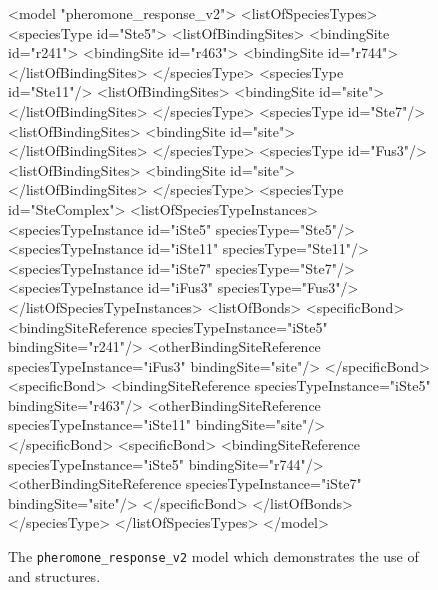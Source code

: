 \documentclass{cekarticle}
\begin{document}
\begin{figure}[h]
\begin{example}
<model "pheromone_response_v2">
    <listOfSpeciesTypes>
        <speciesType id="Ste5">
            <listOfBindingSites>
                <bindingSite id="r241">
                <bindingSite id="r463">
                <bindingSite id="r744">
            </listOfBindingSites>
        </speciesType>
        <speciesType id="Ste11"/>
            <listOfBindingSites>
                <bindingSite id="site">
            </listOfBindingSites>
        </speciesType>
        <speciesType id="Ste7"/>
            <listOfBindingSites>
                <bindingSite id="site">
            </listOfBindingSites>
        </speciesType>
        <speciesType id="Fus3"/>
            <listOfBindingSites>
                <bindingSite id="site">
            </listOfBindingSites>
        </speciesType>
        <speciesType id="SteComplex">
            <listOfSpeciesTypeInstances>
                <speciesTypeInstance id="iSte5" speciesType="Ste5"/>
                <speciesTypeInstance id="iSte11" speciesType="Ste11"/>
                <speciesTypeInstance id="iSte7" speciesType="Ste7"/>
                <speciesTypeInstance id="iFus3" speciesType="Fus3"/>
            </listOfSpeciesTypeInstances>
            <listOfBonds>
                <specificBond>
                    <bindingSiteReference speciesTypeInstance="iSte5" bindingSite="r241"/>
                    <otherBindingSiteReference
                        speciesTypeInstance="iFus3" bindingSite="site"/>
                </specificBond>
                <specificBond>
                    <bindingSiteReference speciesTypeInstance="iSte5" bindingSite="r463"/>
                    <otherBindingSiteReference
                        speciesTypeInstance="iSte11" bindingSite="site"/>
                </specificBond>
                <specificBond>
                    <bindingSiteReference speciesTypeInstance="iSte5" bindingSite="r744"/>
                    <otherBindingSiteReference
                        speciesTypeInstance="iSte7" bindingSite="site"/>
                </specificBond>
            </listOfBonds>
        </speciesType>
    </listOfSpeciesTypes>
</model>
\end{example}
  \caption{The
  \texttt{pheromone\_response\_v2}
  model which demonstrates the use of  and  structures.}
  \label{fig:pheromone_response_v2-xml}
\end{figure}
\end{document}
